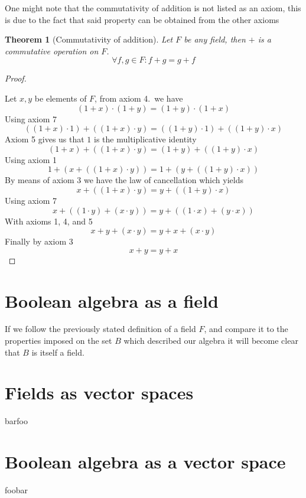 \documentclass{article}
\newtheorem*{theorem}{Theorem}
\begin{document}
One might note that the commutativity of addition is not listed as an axiom,
this is due to the fact that said property can be obtained from the other axioms

\begin{theorem}[Commutativity of addition]

  Let $F$ be any field, then $+$ is a commutative operation on $F$.
  $$\forall f,g \in F :  f + g = g + f$$
\end{theorem}
\begin{proof}\cite{addcomm}

Let $x, y$ be elements of $F$, from axiom 4.\ we have
$$(1+x)\cdot(1+y)=(1+y)\cdot(1+x)$$
Using axiom 7
$$((1+x)\cdot 1)+((1+x)\cdot y) = ((1+y)\cdot 1)+((1+y)\cdot x)$$
Axiom 5 gives us that $1$ is the multiplicative identity
$$(1+x)+((1+x)\cdot y) = (1+y)+((1+y)\cdot x)$$
Using axiom 1
$$1+(x+((1+x)\cdot y)) = 1+(y+((1+y)\cdot x))$$
By means of axiom 3 we have the law of cancellation which yields
$$x+((1+x)\cdot y) = y+((1+y)\cdot x)$$
Using axiom 7
$$x+((1\cdot y)+(x\cdot y)) = y+((1\cdot x)+(y\cdot x))$$
With axioms 1, 4, and 5
$$x+y+(x\cdot y) = y+x+(x\cdot y)$$
Finally by axiom 3
$$x+y=y+x$$
\end{proof}
\section{Boolean algebra as a field}
\label{sec:Boolean algebra as a field}

If we follow the previously stated definition of a field $F$, and compare it to
the properties imposed on the set $B$ which described our algebra it will become
clear that $B$ is itself a field.

\section{Fields as vector spaces}
\label{sec:Fields as vector spaces}

barfoo

\section{Boolean algebra as a vector space}
\label{sec:Boolean algebra as a vector space}

foobar

\newpage



\end{document}
